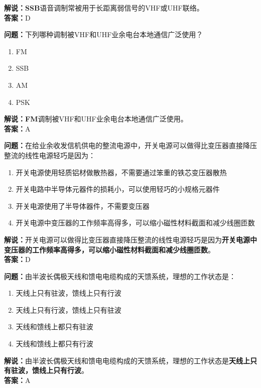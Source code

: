 \textbf{解说：}\textbf{SSB}语音调制常被用于长距离弱信号的VHF或UHF联络。\\\textbf{答案：}D%



\textbf{问题：}下列哪种调制被VHF和UHF业余电台本地通信广泛使用？

\begin{enumerate}[label=\Alph*), leftmargin=1.5cm]
	\item FM
	\item SSB
	\item AM
	\item PSK
\end{enumerate}


\textbf{解说：}\textbf{FM}调制被VHF和UHF业余电台本地通信广泛使用。\\\textbf{答案：}A%



\textbf{问题：}在给业余收发信机供电的整流电源中，开关电源可以做得比变压器直接降压整流的线性电源轻巧是因为：

\begin{enumerate}[label=\Alph*), leftmargin=1.5cm]
	\item 开关电源使用轻质铝材做散热器，不需要通过笨重的铁芯变压器散热
	\item 开关电路中半导体元器件的损耗小，可以使用轻巧的小规格元器件
	\item 开关电源使用了半导体器件，不需要变压器
	\item 开关电源中变压器的工作频率高得多，可以缩小磁性材料截面和减少线圈匝数
\end{enumerate}

\textbf{解说：}开关电源可以做得比变压器直接降压整流的线性电源轻巧是因为\textbf{开关电源中变压器的工作频率高得多，可以缩小磁性材料截面和减少线圈匝数}。\\\textbf{答案：}D%



\textbf{问题：}由半波长偶极天线和馈电电缆构成的天馈系统，理想的工作状态是：

\begin{enumerate}[label=\Alph*), leftmargin=1.5cm]
	\item 天线上只有驻波，馈线上只有行波
	\item 天线上只有行波，馈线上只有驻波
	\item 天线和馈线上都只有驻波
	\item 天线和馈线上都只有行波
\end{enumerate}

\textbf{解说：}由半波长偶极天线和馈电电缆构成的天馈系统，理想的工作状态是\textbf{天线上只有驻波，馈线上只有行波}。\\\textbf{答案：}A%



